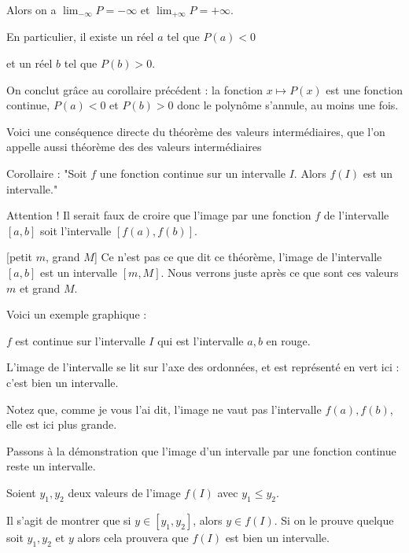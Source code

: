 \change

Alors on a 
$\displaystyle\lim_{-\infty} P = -\infty$ et $\displaystyle\lim_{+\infty} P = +\infty$. 

\change


En particulier, il existe un réel $a$ tel que $P(a)<0$ 

et un réel $b$ tel que $P(b)>0$.

\change

On conclut grâce au corollaire précédent : la fonction $x \mapsto P(x)$ est une fonction continue,
$P(a)<0$ et $P(b)>0$ donc le polynôme s'annule, au moins une fois.


\diapo

Voici une conséquence directe du théorème des valeurs intermédiaires, que l'on appelle aussi
théorème des des valeurs intermédiaires

Corollaire : "Soit $f$ une fonction continue sur un intervalle $I$. 
Alors $f(I)$ est un intervalle."


\change

Attention ! Il serait faux de croire que l'image par une fonction $f$ de l'intervalle $[a,b]$ 
soit l'intervalle $[f(a),f(b)]$.

[petit $m$, grand $M$]
Ce n'est pas ce que dit ce théorème, l'image de l'intervalle $[a,b]$ est un intervalle $[m,M]$. 
Nous verrons juste après ce que sont ces valeurs $m$ et grand $M$.


\change

Voici un exemple graphique :

$f$ est continue sur l'intervalle $I$ qui est l'intervalle $a,b$ en rouge.

L'image de l'intervalle se lit sur l'axe des ordonnées, et est représenté en vert ici : 
c'est bien un intervalle.

Notez que, comme je vous l'ai dit, l'image ne vaut pas l'intervalle $f(a),f(b)$, elle est ici plus grande.




\diapo

Passons à la démonstration que l'image d'un intervalle par une fonction continue reste un intervalle.

\change

Soient $y_1,y_2$ deux valeurs de l'image $f(I)$ avec $y_1\leq y_2$. 

Il s'agit de montrer que si $y\in[y_1,y_2]$, alors $y\in f(I)$. Si on le prouve quelque soit $y_1,y_2$ et $y$ 
alors cela prouvera que $f(I)$ est bien un intervalle.


